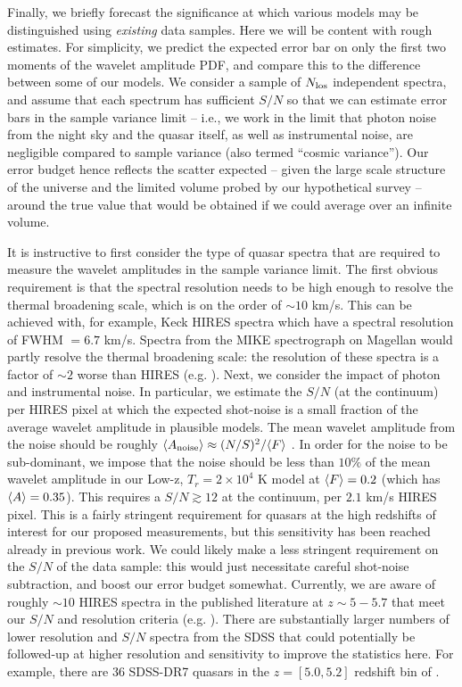 Finally, we briefly forecast the significance at which various models may be distinguished using {\it existing} data samples. Here
we will be content with rough estimates. For simplicity, we predict the expected error bar on
only the first two moments of the wavelet amplitude PDF, and compare this to the difference between some of our models. 
We consider a sample of $N_{\rm los}$ independent spectra, and assume that each spectrum has sufficient $S/N$ so that
we can estimate error bars in the sample variance limit -- i.e., we work in the limit that photon noise from the night
sky and the quasar itself, as well as instrumental noise, are negligible compared to sample variance (also termed ``cosmic variance''). Our error budget hence reflects the scatter expected -- given the large scale structure of the universe and the limited
volume probed by our hypothetical survey -- around the true value that would be obtained if we could average over an infinite
volume.

It is instructive to first consider the type of quasar spectra that are required to measure the wavelet amplitudes in
the sample variance limit. The first obvious requirement is that the spectral resolution needs to be high enough to resolve
the thermal broadening scale, which is on the order of $\sim 10$ km/s. This can be achieved with, for example, Keck HIRES spectra
which have a spectral resolution of FWHM $= 6.7$ km/s. Spectra from the MIKE spectrograph
on Magellan would partly resolve the thermal broadening scale: the resolution of these spectra is a factor of $\sim 2$ worse
than HIRES (e.g. \citealt{Becker:2010cu}). Next, we consider the impact of photon and instrumental noise. In particular,
we estimate the $S/N$ (at the continuum) per HIRES pixel at which the expected shot-noise is a small fraction of the average wavelet amplitude in plausible models. The mean wavelet amplitude from the noise should be roughly 
$\langle A_{\rm noise} \rangle \approx (N/S)^2/\langle F \rangle$ \citep{Hui:2000rw,Lidz:2009ca}. In order for the noise to be sub-dominant, we impose
that the noise should be less than $10\%$ of the
mean wavelet amplitude in our Low-z, $T_r = 2 \times 10^4$ K model at $\langle F \rangle=0.2$ (which has $\langle A \rangle=0.35$). This requires a
$S/N \gtrsim 12$ at the continuum, per $2.1$ km/s HIRES pixel. This is a fairly stringent requirement for quasars at the high
redshifts of interest for our proposed measurements, but this sensitivity has been reached already in previous work. We 
could likely make a less stringent
requirement on the $S/N$ of the data sample: this would just necessitate careful shot-noise subtraction, and boost our error budget
somewhat.   
Currently, we are aware of 
roughly $\sim 10$ HIRES spectra in the published literature at $z \sim 5-5.7$ that meet our $S/N$ and resolution criteria 
(e.g. \citealt{Becker:2011ee}). There are substantially larger numbers of lower resolution and $S/N$ spectra
from the SDSS that could potentially be followed-up at higher resolution and sensitivity to improve the statistics here. For example, there
are $36$ SDSS-DR7 quasars in the $z =[5.0,5.2]$ redshift bin of \citet{Becker:2012aq}.

